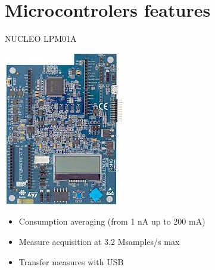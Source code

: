 \documentclass[
	11pt, %
]{beamer}
\begin{document}
\section{Microcontrolers features}

\begin{frame}{NUCLEO LPM01A}
	\centering
    \begin{minipage}{0.4\textwidth}
		\includegraphics[scale = 0.5]{images/lpm01a.jpeg}
	\end{minipage}
	\begin{minipage}{0.50\textwidth}
		\centering
		\begin{itemize}
			\item Consumption averaging (from 1 nA up to 200 mA)
			\item Measure acquisition at 3.2 Msamples/s max
			\item Transfer measures with USB
		\end{itemize}
		\end{minipage}
\end{frame}
\end{document}
